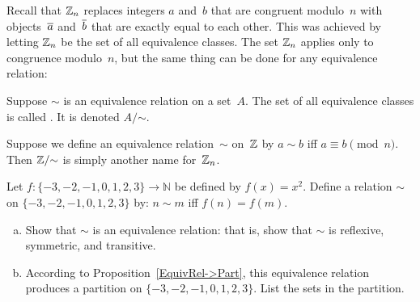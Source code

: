 Recall that $\mathbb{Z}_n$ replaces integers $a$ and~$b$ that are congruent modulo~$n$ with objects~$\overline{a}$ and~$\overline{b}$ that are exactly equal to each other. This was achieved by letting $\mathbb{Z}_n$ be the set of all equivalence classes. The set $\mathbb{Z}_n$ applies only to congruence modulo~$n$, but the same thing can be done for any equivalence relation:

\begin{defn}
Suppose $\sim$ is an equivalence relation on a set~$A$. The set of all equivalence classes is called . It is denoted $A/\mathord{\sim}$.
\end{defn}

\begin{eg}
Suppose we define an equivalence relation~$\sim$ on~$\mathbb{Z}$ by $a \sim b$ iff $a \equiv b \pmod{n}$. Then $\mathbb{Z}/\mathord{\sim}$ is simply another name for~$\mathbb{Z}_n$.
\end{eg}

\begin{exercise}{66}
Let $f\colon \{-3,-2,-1,0,1,2,3\} \to \mathbb{N}$ be defined by $f(x) =  x^2$. Define a relation $\sim$ on $\{-3,-2,-1,0,1,2,3\}$ by: $n \sim m$ iff $f(n) = f(m)$.
\begin{enumerate}[(a)]
\item
Show that $\sim$ is an equivalence relation: that is, show that $\sim$ is reflexive, symmetric, and transitive.
\item
According to Proposition~\ref{EquivRel->Part}, this equivalence relation produces a partition on  $\{-3,-2,-1,0,1,2,3\}$. List the sets in the partition.
\end{enumerate}
\end{exercise}

